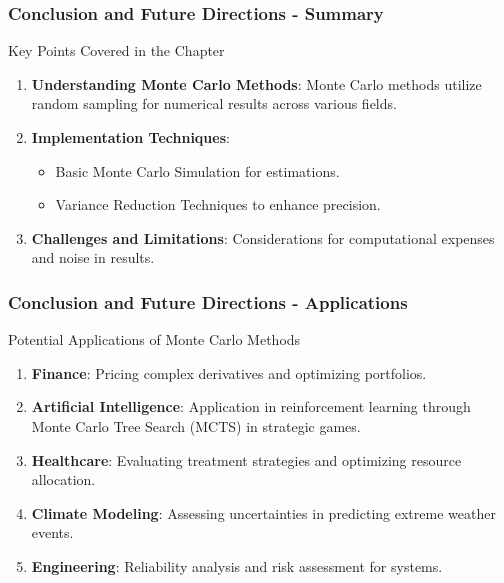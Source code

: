 \documentclass[aspectratio=169]{beamer}
\begin{document}
\begin{frame}[fragile]
    \frametitle{Conclusion and Future Directions - Summary}
    \begin{block}{Key Points Covered in the Chapter}
        \begin{enumerate}
            \item \textbf{Understanding Monte Carlo Methods}: 
            Monte Carlo methods utilize random sampling for numerical results across various fields.

            \item \textbf{Implementation Techniques}:
            \begin{itemize}
                \item Basic Monte Carlo Simulation for estimations.
                \item Variance Reduction Techniques to enhance precision.
            \end{itemize}

            \item \textbf{Challenges and Limitations}: 
            Considerations for computational expenses and noise in results.
        \end{enumerate}
    \end{block}
\end{frame}

\begin{frame}[fragile]
    \frametitle{Conclusion and Future Directions - Applications}
    \begin{block}{Potential Applications of Monte Carlo Methods}
        \begin{enumerate}
            \item \textbf{Finance}:
            Pricing complex derivatives and optimizing portfolios.
            
            \item \textbf{Artificial Intelligence}:
            Application in reinforcement learning through Monte Carlo Tree Search (MCTS) in strategic games.
            
            \item \textbf{Healthcare}:
            Evaluating treatment strategies and optimizing resource allocation.
            
            \item \textbf{Climate Modeling}:
            Assessing uncertainties in predicting extreme weather events.
            
            \item \textbf{Engineering}:
            Reliability analysis and risk assessment for systems.
        \end{enumerate}
    \end{block}
\end{frame}
\end{document}
